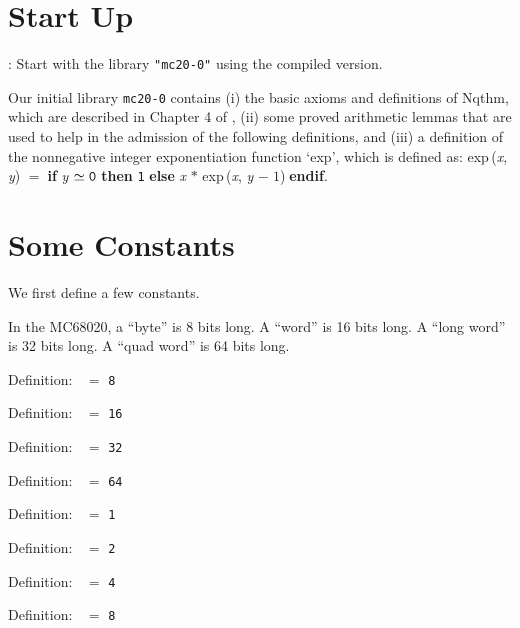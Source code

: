 \section{Start Up}




:   Start with the library {\tt{"mc20-0"}} using the compiled version.

\addvspace{18pt}



Our initial library {\tt mc20-0} contains (i) the basic axioms and definitions
of Nqthm, which are described in Chapter 4 of \cite{BM-88}, (ii) some proved
arithmetic lemmas that are used to help in the admission of the following
definitions, and (iii) a definition of the nonnegative integer exponentiation
function `exp', which is defined as: {\rm{exp}}\,({\it{x\/}}, {\it{y\/}}) $=$$\;${\bf if }{\it{y\/}} $\simeq {\tt{0}}$ {\bf then }{\tt{1}} {\bf else }{\it{x\/}} $*$ {\rm{exp}}\,({\it{x\/}}, {\it{y\/}} $-\;1$)$\;${\bf  endif}.  

\section{Some Constants}

We first define a few constants.



 In the MC68020, a ``byte'' is 8 bits long.  A ``word'' is 16 bits long. 
 A ``long word'' is 32 bits long.  A ``quad word'' is 64 bits long.

\begin{tabbing}{\sc Definition}:$\;\;$
{} $=$ {\tt{8}}
\end{tabbing}
\begin{tabbing}{\sc Definition}:$\;\;$
{} $=$ {\tt{16}}
\end{tabbing}
\begin{tabbing}{\sc Definition}:$\;\;$
{} $=$ {\tt{32}}
\end{tabbing}
\begin{tabbing}{\sc Definition}:$\;\;$
{} $=$ {\tt{64}}
\end{tabbing}

\begin{tabbing}{\sc Definition}:$\;\;$
{} $=$ {\tt{1}}
\end{tabbing}
\begin{tabbing}{\sc Definition}:$\;\;$
{} $=$ {\tt{2}}
\end{tabbing}
\begin{tabbing}{\sc Definition}:$\;\;$
{} $=$ {\tt{4}}
\end{tabbing}
\begin{tabbing}{\sc Definition}:$\;\;$
{} $=$ {\tt{8}}
\end{tabbing}

